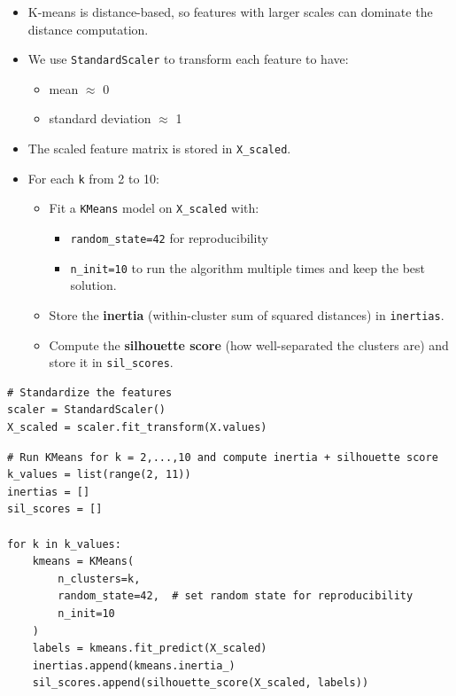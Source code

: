 \documentclass{article}
\begin{document}
\begin{itemize}
\item K-means is distance-based, so features with larger scales can dominate the distance computation.
\item We use \texttt{StandardScaler} to transform each feature to have:

\begin{itemize}
\item mean $\approx$ 0
\item standard deviation $\approx$ 1
\end{itemize}


\item The scaled feature matrix is stored in \texttt{X\_scaled}.
\item For each \texttt{k} from 2 to 10:

\begin{itemize}
\item Fit a \texttt{KMeans} model on \texttt{X\_scaled} with:

\begin{itemize}
\item \texttt{random\_state=42} for reproducibility
\item \texttt{n\_init=10} to run the algorithm multiple times and keep the best solution.
\end{itemize}


\item Store the \textbf{inertia} (within-cluster sum of squared distances) in \texttt{inertias}.
\item Compute the \textbf{silhouette score} (how well-separated the clusters are) and store it in \texttt{sil\_scores}.
\end{itemize}
\end{itemize}

\begin{verbatim}
# Standardize the features
scaler = StandardScaler()
X_scaled = scaler.fit_transform(X.values)
\end{verbatim}

\begin{verbatim}
# Run KMeans for k = 2,...,10 and compute inertia + silhouette score
k_values = list(range(2, 11))
inertias = []
sil_scores = []

for k in k_values:
    kmeans = KMeans(
        n_clusters=k,
        random_state=42,  # set random state for reproducibility
        n_init=10
    )
    labels = kmeans.fit_predict(X_scaled)
    inertias.append(kmeans.inertia_)
    sil_scores.append(silhouette_score(X_scaled, labels))
\end{verbatim}
\end{document}
